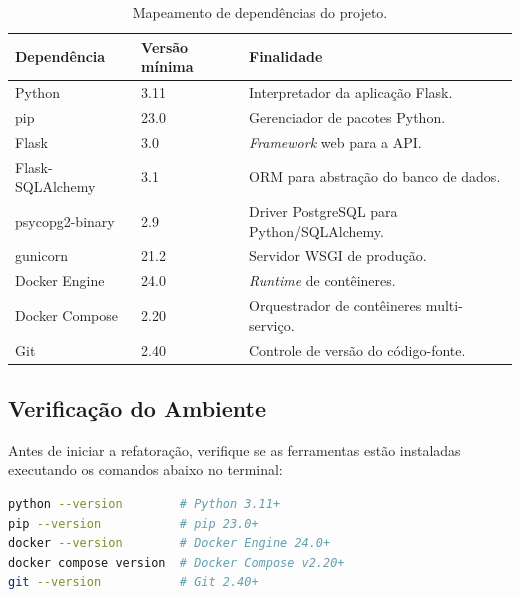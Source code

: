 \documentclass[12pt,a4paper]{article}
\begin{document}
\begin{table}[h!]
  \centering
  \caption{Mapeamento de dependências do projeto.}
  \label{tab:dependencias}
  \begin{tabular}{llp{7cm}}
    \toprule
    \textbf{Dependência}         & \textbf{Versão mínima} & \textbf{Finalidade} \\
    \midrule
    Python                       & 3.11                   & Interpretador da aplicação Flask. \\
    pip                          & 23.0                   & Gerenciador de pacotes Python. \\
    Flask                        & 3.0                    & \textit{Framework} web para a API. \\
    Flask-SQLAlchemy             & 3.1                    & ORM para abstração do banco de dados. \\
    psycopg2-binary              & 2.9                    & Driver PostgreSQL para Python/SQLAlchemy. \\
    gunicorn                     & 21.2                   & Servidor WSGI de produção. \\
    Docker Engine                & 24.0                   & \textit{Runtime} de contêineres. \\
    Docker Compose               & 2.20                   & Orquestrador de contêineres multi-serviço. \\
    Git                          & 2.40                   & Controle de versão do código-fonte. \\
    \bottomrule
  \end{tabular}
\end{table}

\subsection{Verificação do Ambiente}

Antes de iniciar a refatoração, verifique se as ferramentas estão instaladas
executando os comandos abaixo no terminal:

\begin{lstlisting}[language=bash, caption={Verificação das dependências do ambiente.}]
python --version        # Python 3.11+
pip --version           # pip 23.0+
docker --version        # Docker Engine 24.0+
docker compose version  # Docker Compose v2.20+
git --version           # Git 2.40+
\end{lstlisting}
\end{document}
